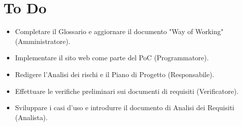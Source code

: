 \documentclass[a4paper, 12pt]{article}
\begin{document}
\section{To Do}
\begin{itemize}
    \item Completare il Glossario e aggiornare il documento "Way of Working" (Amministratore).
    \item Implementare il sito web come parte del PoC (Programmatore).
    \item Redigere l'Analisi dei rischi e il Piano di Progetto (Responsabile).
    \item Effettuare le verifiche preliminari sui documenti di requisiti (Verificatore).
    \item Sviluppare i casi d'uso e introdurre il documento di Analisi dei Requisiti (Analista).
\end{itemize}
\end{document}
